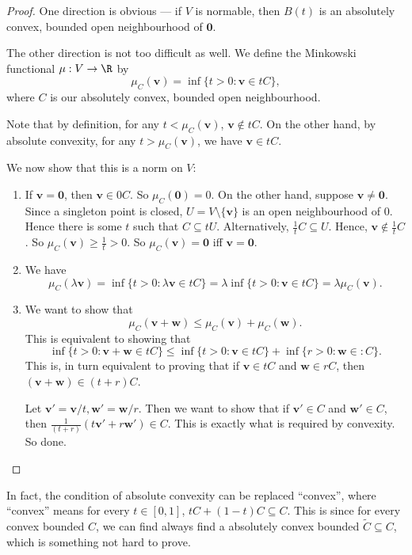 \documentclass[a4paper]{article}
\begin{document}
\begin{proof}
  One direction is obvious --- if $V$ is normable, then $B(t)$ is an absolutely convex, bounded open neighbourhood of $\mathbf{0}$.

  The other direction is not too difficult as well. We define the Minkowski functional $\mu: V \to \R$ by
  \[
    \mu_C(\mathbf{v}) = \inf \{t > 0: \mathbf{v}\in tC\},
  \]
  where $C$ is our absolutely convex, bounded open neighbourhood.

  Note that by definition, for any $t < \mu_C(\mathbf{v})$, $\mathbf{v}\not\in tC$. On the other hand, by absolute convexity, for any $t > \mu_C(\mathbf{v})$, we have $\mathbf{v}\in tC$.

  We now show that this is a norm on $V$:
  \begin{enumerate}
    \item If $\mathbf{v} = \mathbf{0}$, then $\mathbf{v}\in 0C$. So $\mu_C(\mathbf{0}) = 0$. On the other hand, suppose $\mathbf{v} \not= \mathbf{0}$. Since a singleton point is closed, $U = V\setminus \{\mathbf{v}\}$ is an open neighbourhood of $0$. Hence there is some $t$ such that $C\subseteq tU$. Alternatively, $\frac{1}{t}C \subseteq U$. Hence, $\mathbf{v}\not\in \frac{1}{t}C$. So $\mu_C (\mathbf{v}) \geq \frac{1}{t} > 0$. So $\mu_C (\mathbf{v}) = \mathbf{0}$ iff $\mathbf{v} = \mathbf{0}$.

    \item We have
      \[
        \mu_C(\lambda \mathbf{v}) = \inf \{t> 0: \lambda \mathbf{v}\in tC\} = \lambda \inf \{t > 0: \mathbf{v}\in tC\} = \lambda \mu_C(\mathbf{v}).
      \]
    \item We want to show that
      \[
        \mu_C (\mathbf{v} + \mathbf{w}) \leq \mu_C(\mathbf{v}) + \mu_C(\mathbf{w}).
      \]
      This is equivalent to showing that
      \[
        \inf\{t > 0: \mathbf{v} + \mathbf{w} \in tC\} \leq \inf\{t > 0: \mathbf{v}\in tC\} + \inf\{r > 0: \mathbf{w}\in :C\}.
      \]
      This is, in turn equivalent to proving that if $\mathbf{v}\in tC$ and $\mathbf{w}\in rC$, then $(\mathbf{v} + \mathbf{w})\in (t + r)C$.

      Let $\mathbf{v}' = \mathbf{v}/t, \mathbf{w}' = \mathbf{w}/r$. Then we want to show that if $\mathbf{v}' \in C$ and $\mathbf{w}' \in C$, then $\frac{1}{(t + r)}(t \mathbf{v}' + r \mathbf{w}') \in C$. This is exactly what is required by convexity. So done.
  \end{enumerate}
\end{proof}
In fact, the condition of absolute convexity can be replaced ``convex'', where ``convex'' means for every $t\in [0, 1]$, $tC + (1 - t)C \subseteq C$. This is since for every convex bounded $C$, we can find always find a absolutely convex bounded $\tilde{C} \subseteq C$, which is something not hard to prove.
\end{document}
